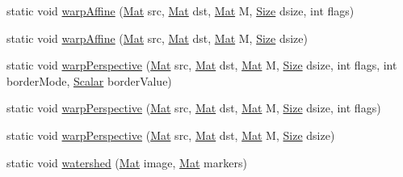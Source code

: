 \begin{DoxyCompactItemize}
\item 
static void \mbox{\hyperlink{classorg_1_1opencv_1_1imgproc_1_1_imgproc_a261169d40fb66824c5cb3e5f86df0799}{warp\+Affine}} (\mbox{\hyperlink{classorg_1_1opencv_1_1core_1_1_mat}{Mat}} src, \mbox{\hyperlink{classorg_1_1opencv_1_1core_1_1_mat}{Mat}} dst, \mbox{\hyperlink{classorg_1_1opencv_1_1core_1_1_mat}{Mat}} M, \mbox{\hyperlink{classorg_1_1opencv_1_1core_1_1_size}{Size}} dsize, int flags)
\item 
static void \mbox{\hyperlink{classorg_1_1opencv_1_1imgproc_1_1_imgproc_a0fdebc53734476460d5fe9b2cb3b5154}{warp\+Affine}} (\mbox{\hyperlink{classorg_1_1opencv_1_1core_1_1_mat}{Mat}} src, \mbox{\hyperlink{classorg_1_1opencv_1_1core_1_1_mat}{Mat}} dst, \mbox{\hyperlink{classorg_1_1opencv_1_1core_1_1_mat}{Mat}} M, \mbox{\hyperlink{classorg_1_1opencv_1_1core_1_1_size}{Size}} dsize)
\item 
static void \mbox{\hyperlink{classorg_1_1opencv_1_1imgproc_1_1_imgproc_aad167fa9fe0009a54f7732488102938c}{warp\+Perspective}} (\mbox{\hyperlink{classorg_1_1opencv_1_1core_1_1_mat}{Mat}} src, \mbox{\hyperlink{classorg_1_1opencv_1_1core_1_1_mat}{Mat}} dst, \mbox{\hyperlink{classorg_1_1opencv_1_1core_1_1_mat}{Mat}} M, \mbox{\hyperlink{classorg_1_1opencv_1_1core_1_1_size}{Size}} dsize, int flags, int border\+Mode, \mbox{\hyperlink{classorg_1_1opencv_1_1core_1_1_scalar}{Scalar}} border\+Value)
\item 
static void \mbox{\hyperlink{classorg_1_1opencv_1_1imgproc_1_1_imgproc_a3608b9b4fab7fe199ebcfeed938d59f5}{warp\+Perspective}} (\mbox{\hyperlink{classorg_1_1opencv_1_1core_1_1_mat}{Mat}} src, \mbox{\hyperlink{classorg_1_1opencv_1_1core_1_1_mat}{Mat}} dst, \mbox{\hyperlink{classorg_1_1opencv_1_1core_1_1_mat}{Mat}} M, \mbox{\hyperlink{classorg_1_1opencv_1_1core_1_1_size}{Size}} dsize, int flags)
\item 
static void \mbox{\hyperlink{classorg_1_1opencv_1_1imgproc_1_1_imgproc_a1c33b5777145642c0670124ea3a35b01}{warp\+Perspective}} (\mbox{\hyperlink{classorg_1_1opencv_1_1core_1_1_mat}{Mat}} src, \mbox{\hyperlink{classorg_1_1opencv_1_1core_1_1_mat}{Mat}} dst, \mbox{\hyperlink{classorg_1_1opencv_1_1core_1_1_mat}{Mat}} M, \mbox{\hyperlink{classorg_1_1opencv_1_1core_1_1_size}{Size}} dsize)
\item 
static void \mbox{\hyperlink{classorg_1_1opencv_1_1imgproc_1_1_imgproc_a3d24a06a891561fbcf918cefee4f1977}{watershed}} (\mbox{\hyperlink{classorg_1_1opencv_1_1core_1_1_mat}{Mat}} image, \mbox{\hyperlink{classorg_1_1opencv_1_1core_1_1_mat}{Mat}} markers)
\end{DoxyCompactItemize}
